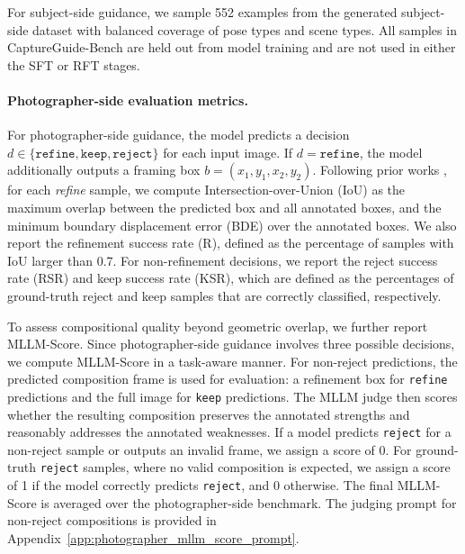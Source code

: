 \documentclass{llmxive}
\begin{document}
For subject-side guidance, we sample 552 examples from the generated subject-side dataset with balanced coverage of pose types and scene types. All samples in CaptureGuide-Bench are held out from model training and are not used in either the SFT or RFT stages.

\paragraph{Photographer-side evaluation metrics.}
For photographer-side guidance, the model predicts a decision $d \in \{\texttt{refine}, \texttt{keep}, \texttt{reject}\}$ for each input image. If $d=\texttt{refine}$, the model additionally outputs a framing box $b=(x_1,y_1,x_2,y_2)$. Following prior works \citep{fang2014automatic,zhang2022human}, for each \textit{refine} sample, we compute Intersection-over-Union (IoU) as the maximum overlap between the predicted box and all annotated boxes, and the minimum boundary displacement error (BDE) over the annotated boxes. We also report the refinement success rate (R), defined as the percentage of samples with IoU larger than 0.7. 
For non-refinement decisions, we report the reject success rate (RSR) and keep success rate (KSR), which are defined as the percentages of ground-truth reject and keep samples that are correctly classified, respectively.

To assess compositional quality beyond geometric overlap, we further report MLLM-Score. Since
photographer-side guidance involves three possible decisions, we compute MLLM-Score in a
task-aware manner. For non-reject predictions, the predicted composition frame is used for evaluation:
a refinement box for \texttt{refine} predictions and the full image for \texttt{keep}
predictions. The MLLM judge then scores whether the resulting composition preserves the annotated
strengths and reasonably addresses the annotated weaknesses. If a model predicts \texttt{reject} for
a non-reject sample or outputs an invalid frame, we assign a score of 0. For ground-truth
\texttt{reject} samples, where no valid composition is expected, we assign a score of 1 if the model correctly predicts \texttt{reject}, and 0 otherwise. The final
MLLM-Score is averaged over the photographer-side benchmark. The judging prompt for non-reject compositions is provided in Appendix~\ref{app:photographer_mllm_score_prompt}.
\end{document}
